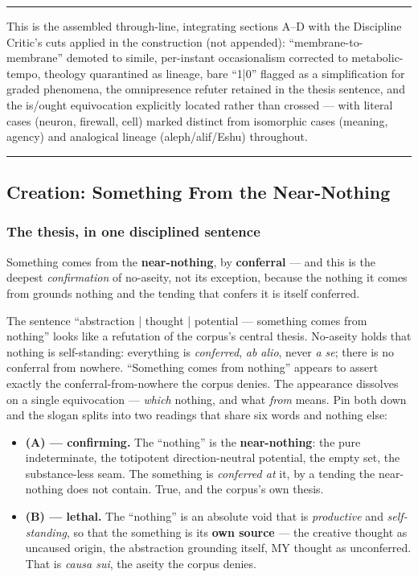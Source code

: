 \documentclass[11pt]{article}
\begin{document}
\medskip\noindent\rule{\linewidth}{0.3pt}\medskip

This is the assembled through-line, integrating sections A–D with the Discipline Critic's cuts applied in the construction (not appended): ``membrane-to-membrane'' demoted to simile, per-instant occasionalism corrected to metabolic-tempo, theology quarantined as lineage, bare ``1|0'' flagged as a simplification for graded phenomena, the omnipresence refuter retained in the thesis sentence, and the is/\allowbreak{}ought equivocation explicitly located rather than crossed — with literal cases (neuron, firewall, cell) marked distinct from isomorphic cases (meaning, agency) and analogical lineage (aleph/\allowbreak{}alif/\allowbreak{}Eshu) throughout.

\medskip\noindent\rule{\linewidth}{0.3pt}\medskip

\subsection*{Creation: Something From the Near-Nothing}

\subsubsection*{The thesis, in one disciplined sentence}

Something comes from the \textbf{near-nothing}, by \textbf{conferral} — and this is the deepest \emph{confirmation} of no-aseity, not its exception, because the nothing it comes from grounds nothing and the tending that confers it is itself conferred.

The sentence ``abstraction | thought | potential — something comes from nothing'' looks like a refutation of the corpus's central thesis. No-aseity holds that nothing is self-standing: everything is \emph{conferred}, \emph{ab alio}, never \emph{a se}; there is no conferral from nowhere. ``Something comes from nothing'' appears to assert exactly the conferral-from-nowhere the corpus denies. The appearance dissolves on a single equivocation — \emph{which} nothing, and what \emph{from} means. Pin both down and the slogan splits into two readings that share six words and nothing else:

\begin{itemize}
\item \textbf{(A) — confirming.} The ``nothing'' is the \textbf{near-nothing}: the pure indeterminate, the totipotent direction-neutral potential, the empty set, the substance-less seam. The something is \emph{conferred at} it, by a tending the near-nothing does not contain. True, and the corpus's own thesis.
\item \textbf{(B) — lethal.} The ``nothing'' is an absolute void that is \emph{productive} and \emph{self-standing}, so that the something is its \textbf{own source} — the creative thought as uncaused origin, the abstraction grounding itself, MY thought as unconferred. That is \emph{causa sui}, the aseity the corpus denies.
\end{itemize}
\end{document}
